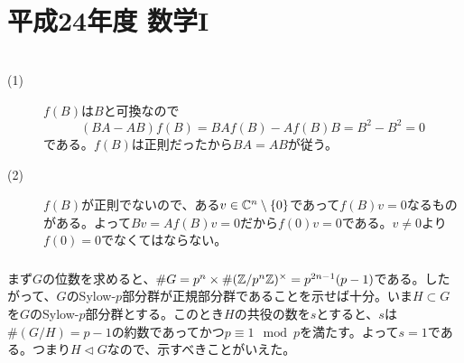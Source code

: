 \section{平成24年度 数学I}



\subsubsection{}%
\begin{sol} ${}$
\begin{description}
  \item[(1)] $f(B)$は$B$と可換なので
  \[
  (BA - AB)f(B) = B Af(B) - A f(B) B = B^2 - B^2 = 0
  \]
  である。$f(B)$は正則だったから$BA=AB$が従う。
  \item[(2)] $f(B)$が正則でないので、ある$v \in {\mathbb C}^n \setminus \{ 0 \}$であって$f(B)v=0$なるものがある。よって$Bv = Af(B) v = 0$だから$f(0)v= 0$である。$v \neq 0$より$f(0)=0$でなくてはならない。
\end{description}
\end{sol}



\newpage



\subsubsection{}%
\begin{sol}
まず$G$の位数を求めると、$\# G = p^n \times \#(\mathbb{Z} / p^n \mathbb{Z})^{\times}  = p^{2n-1}(p-1)$である。したがって、$G$のSylow-$p$部分群が正規部分群であることを示せば十分。いま$H \subset G$を$G$のSylow-$p$部分群とする。このとき$H$の共役の数を$s$とすると、$s$は$\# (G/H) = p-1$の約数であってかつ$p \equiv 1 \mod p$を満たす。よって$s = 1$である。つまり$H \lhd G$なので、示すべきことがいえた。
\end{sol}


